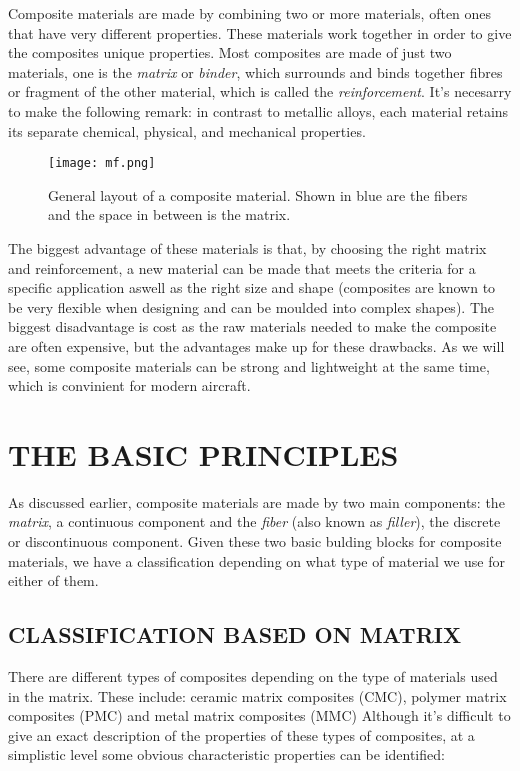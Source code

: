 \documentclass[letterpaper]{article}
\begin{document}
\begin{multicols}{2}
	Composite materials are made by combining two or more materials, often ones that have very different properties. These materials work together in order to give the composites unique properties. Most composites are made of just two materials, one is the \textit{matrix} or \textit{binder}, which surrounds and binds together fibres or fragment of the other material, which is called the \textit{reinforcement}.\supercite{rsc} It's necesarry to make the following remark: in contrast to metallic alloys, each material retains its separate chemical, physical, and mechanical properties.
	\begin{figure}[H]
		\centering
		\texttt{[image: mf.png]}
		\caption{General layout of a composite material. Shown in blue are the fibers and the space in between is the matrix.}
	\end{figure}
	The biggest advantage of these materials is that, by choosing the right matrix and reinforcement, a new material can be made that meets the criteria for a specific application aswell as the right size and shape (composites are known to be very flexible when designing and can be moulded into complex shapes). The biggest disadvantage is cost as the raw materials needed to make the composite are often expensive, but the advantages make up for these drawbacks. As we will see, some composite materials can be strong and lightweight at the same time, which is convinient for modern aircraft.

	\section{THE BASIC PRINCIPLES}
	As discussed earlier, composite materials are made by two main components: the \textit{matrix}, a continuous component and the \textit{fiber} (also known as \textit{filler}), the discrete or discontinuous component. Given these two basic bulding blocks for composite materials, we have a classification depending on what type of material we use for either of them.
	\subsection*{CLASSIFICATION BASED ON MATRIX}
	There are different types of composites depending on the type of materials used in the matrix. These include: ceramic matrix composites (CMC), polymer matrix composites (PMC) and metal matrix composites (MMC) \supercite{owonubi19}
	Although it's difficult to give an exact description of the properties of these types of composites, at a simplistic level some obvious characteristic properties can be identified:
	

\end{multicols}
\end{document}
